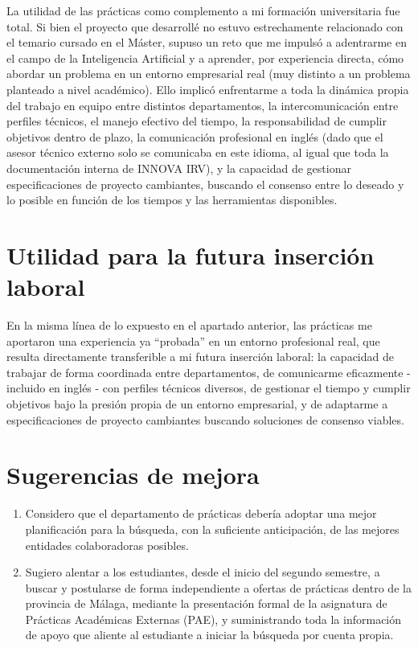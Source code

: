 La utilidad de las prácticas como complemento a mi formación universitaria fue total. Si bien el proyecto que desarrollé no estuvo estrechamente relacionado con el temario cursado en el Máster, supuso un reto que me impulsó a adentrarme en el campo de la Inteligencia Artificial y a aprender, por experiencia directa, cómo abordar un problema en un entorno empresarial real (muy distinto a un problema planteado a nivel académico). Ello implicó enfrentarme a toda la dinámica propia del trabajo en equipo entre distintos departamentos, la intercomunicación entre perfiles técnicos, el manejo efectivo del tiempo, la responsabilidad de cumplir objetivos dentro de plazo, la comunicación profesional en inglés (dado que el asesor técnico externo solo se comunicaba en este idioma, al igual que toda la documentación interna de INNOVA IRV), y la capacidad de gestionar especificaciones de proyecto cambiantes, buscando el consenso entre lo deseado y lo posible en función de los tiempos y las herramientas disponibles.

\section{Utilidad para la futura inserción laboral}

En la misma línea de lo expuesto en el apartado anterior, las prácticas me aportaron una experiencia ya ``probada'' en un entorno profesional real, que resulta directamente transferible a mi futura inserción laboral: la capacidad de trabajar de forma coordinada entre departamentos, de comunicarme eficazmente - incluido en inglés - con perfiles técnicos diversos, de gestionar el tiempo y cumplir objetivos bajo la presión propia de un entorno empresarial, y de adaptarme a especificaciones de proyecto cambiantes buscando soluciones de consenso viables.

\section{Sugerencias de mejora}

\begin{enumerate}
  \item Considero que el departamento de prácticas debería adoptar una mejor planificación para la búsqueda, con la suficiente anticipación, de las mejores entidades colaboradoras posibles.
  \item Sugiero alentar a los estudiantes, desde el inicio del segundo semestre, a buscar y postularse de forma independiente a ofertas de prácticas dentro de la provincia de Málaga, mediante la presentación formal de la asignatura de Prácticas Académicas Externas (PAE), y suministrando toda la información de apoyo que aliente al estudiante a iniciar la búsqueda por cuenta propia.
\end{enumerate}
